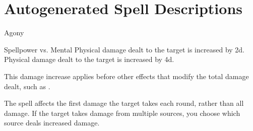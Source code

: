 \section{Autogenerated Spell Descriptions}
\begin{spellsection}{Agony}
\begin{spellheader}
\end{spellheader}
\begin{spellcontent}
\begin{spelltargetinginfo}
\end{spelltargetinginfo}
\begin{spelleffects}
\begin{spellattack}{Spellpower vs. Mental}
\spellsuccess Physical damage dealt to the target is increased by \plus2d.
\spellcritical Physical damage dealt to the target is increased by \plus4d.
\end{spellattack}
\spelldur \durbrief
\end{spelleffects}
\end{spellcontent}
\begin{spellfooter}
\spellnotes This damage increase applies before other effects that modify the total damage dealt, such as .
\miscastexplode
\end{spellfooter}
\begin{spellcantrip}
The spell affects the first damage the target takes each round, rather than all damage.
If the target takes damage from multiple sources, you choose which source deals increased damage.
\end{spellcantrip}
\end{spellsection}
